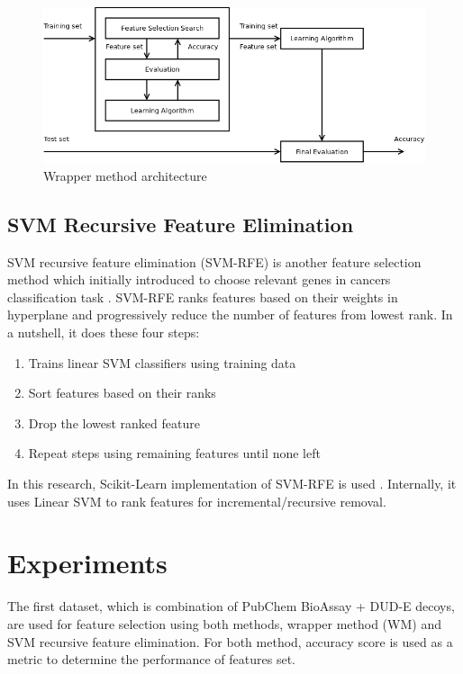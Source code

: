 \documentclass[conference,compsoc,12pt]{IEEEtran}
\begin{document}
	\begin{figure}
		\includegraphics[scale=0.3]{../images/wrapper_method.png}
		\caption{Wrapper method architecture \cite{tang2014feature}}
		\label{fig_wrapper_method_architecture}
	\end{figure}
	
	\subsection{SVM Recursive Feature Elimination}
	
	SVM recursive feature elimination (SVM-RFE) is another feature selection method which initially introduced to choose relevant genes in cancers classification task \cite{guyon2002gene}. SVM-RFE ranks features based on their weights in hyperplane and progressively reduce the number of features from lowest rank. In a nutshell, it does these four steps:
	
	\begin{enumerate}
		\item Trains linear SVM classifiers using training data
		\item Sort features based on their ranks
		\item Drop the lowest ranked feature
		\item Repeat steps using remaining features until none left
	\end{enumerate}
		
	In this research, Scikit-Learn implementation of SVM-RFE is used \cite{pedregosa2011scikit}. Internally, it uses Linear SVM to rank features for incremental/recursive removal.
		
	\section{Experiments} \label{Experiments}
	
	The first dataset, which is combination of PubChem BioAssay + DUD-E decoys, are used for feature selection using both methods, wrapper method (WM) and SVM recursive feature elimination. For both method, accuracy score is used as a metric to determine the performance of features set. 
	
\end{document}
